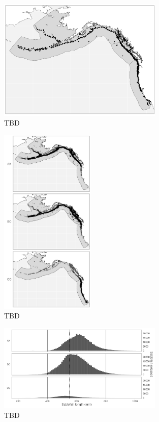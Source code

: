 \documentclass{article}
\begin{document}

\begin{figure}[htb]
    \centering
    \includegraphics[width = 0.7\textwidth]{map-regions-3-released}
    \caption{TBD}
    \label{fig:map-regions-3-released}
\end{figure}

\begin{figure}[htb]
    \centering
    \includegraphics[width = 0.4\textwidth]{map-regions-3-recovered}
    \caption{TBD}
    \label{fig:map-regions-3-recovered}
\end{figure}

\begin{figure}[htb]
    \centering
    \includegraphics[width = 0.7\textwidth]{bar-regions-3-released-by-size}
    \caption{TBD}
    \label{fig:bar-regions-3-released-by-size}
\end{figure}
\end{document}
